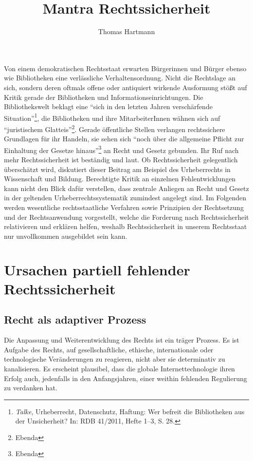 \documentclass[output=paper]{langscibook}
\title{Mantra Rechtssicherheit}
\author{Thomas Hartmann}
\begin{document}
\maketitle
\renewcommand{\thesection}{\Roman{section}} 

\noindent Von einem demokratischen Rechtsstaat erwarten Bürgerinnen und Bürger
ebenso wie Bibliotheken eine verlässliche Verhaltensordnung. Nicht die
Rechtslage an sich, sondern deren oftmals offene oder antiquiert
wirkende Ausformung stößt auf Kritik gerade der Bibliotheken und
Informationseinrichtungen. Die Bibliothekswelt beklagt eine
\enquote{sich in den letzten Jahren verschärfende Situation}\footnote{\emph{Talke},
  Urheberrecht, Datenschutz, Haftung: Wer befreit die Bibliotheken aus
  der Unsicherheit? In: RDB 41/2011, Hefte 1--3, S. 28.}, die
Bibliotheken und ihre MitarbeiterInnen wähnen sich auf
\enquote{juristischem Glatteis}\footnote{Ebenda}. Gerade
öffentliche Stellen verlangen rechtssichere Grundlagen für ihr Handeln,
sie sehen sich \enquote{noch über die allgemeine Pflicht zur Einhaltung
der Gesetze hinaus}\footnote{Ebenda} an Recht und Gesetz
gebunden. Ihr Ruf nach mehr Rechtssicherheit ist beständig und laut. Ob
Rechtssicherheit gelegentlich überschätzt wird, diskutiert dieser
Beitrag am Beispiel des Urheberrechts in Wissenschaft und Bildung.
Berechtigte Kritik an einzelnen Fehlentwicklungen kann nicht den Blick
dafür verstellen, dass zentrale Anliegen an Recht und Gesetz in der
geltenden Urheberrechtssystematik zumindest angelegt sind. Im Folgenden
werden wesentliche rechtsstaatliche Verfahren sowie Prinzipien der
Rechtsetzung und der Rechtsanwendung vorgestellt, welche die Forderung
nach Rechtssicherheit relativieren und erklären helfen, weshalb
Rechtssicherheit in unserem Rechtsstaat nur unvollkommen ausgebildet
sein kann.

\hypertarget{ursachen-partiell-fehlender-rechtssicherheit}{%
\section{Ursachen partiell fehlender
Rechtssicherheit}\label{ursachen-partiell-fehlender-rechtssicherheit}}

\hypertarget{recht-als-adaptiver-prozess}{%
\subsection{Recht als adaptiver
Prozess}\label{recht-als-adaptiver-prozess}}

Die Anpassung und Weiterentwicklung des Rechts ist ein träger Prozess.
Es ist Aufgabe des Rechts, auf gesellschaftliche, ethische,
internationale oder technologische Veränderungen zu reagieren, nicht
aber sie determinativ zu kanalisieren. Es erscheint plausibel, dass die
globale Internettechnologie ihren Erfolg auch, jedenfalls in den
Anfangsjahren, einer weithin fehlenden Regulierung zu verdanken hat.
\end{document}
